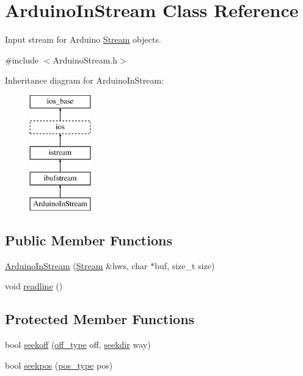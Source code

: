 \hypertarget{class_arduino_in_stream}{\section{Arduino\-In\-Stream Class Reference}
\label{class_arduino_in_stream}
}


Input stream for Arduino \hyperlink{class_stream}{Stream} objects.  




{\ttfamily \#include $<$Arduino\-Stream.\-h$>$}

Inheritance diagram for Arduino\-In\-Stream\-:\begin{figure}[H]
\begin{center}
\leavevmode
\includegraphics[height=5.000000cm]{class_arduino_in_stream}
\end{center}
\end{figure}
\subsection*{Public Member Functions}
\begin{DoxyCompactItemize}
\item 
\hyperlink{class_arduino_in_stream_a7c24d8cc3c6a7df0a61cd2fee16f5d8f}{Arduino\-In\-Stream} (\hyperlink{class_stream}{Stream} \&hws, char $\ast$buf, size\-\_\-t size)
\item 
void \hyperlink{class_arduino_in_stream_a2ff8049394843ee554bb0d24731cd8e3}{readline} ()
\end{DoxyCompactItemize}
\subsection*{Protected Member Functions}
\begin{DoxyCompactItemize}
\item 
bool \hyperlink{class_arduino_in_stream_ae35c72172a96e5292b42d784e542e0e2}{seekoff} (\hyperlink{classios__base_aa302457dd4c50f113d997fbf785a4bda}{off\-\_\-type} off, \hyperlink{classios__base_a5cca6e21eff1a334d30776a5a0f1c5e2}{seekdir} way)
\item 
bool \hyperlink{class_arduino_in_stream_afefb7aca62e5353db6048fb1f0eaf3ff}{seekpos} (\hyperlink{classios__base_a0833e9c1b028d7389a319a3dd11290d3}{pos\-\_\-type} pos)
\end{DoxyCompactItemize}
